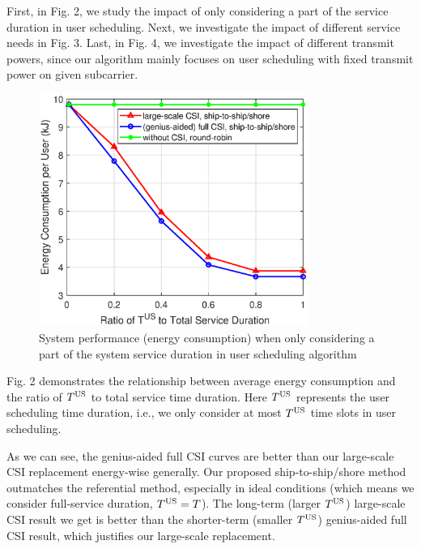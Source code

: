 \documentclass[journal]{IEEEtran}
\begin{document}
   
   
   First, in Fig. 2, we study the impact of only considering a part of the service duration in user scheduling. 
   Next, we investigate the impact of different service needs in Fig. 3. 
   Last, in Fig. 4, we investigate the impact of different transmit powers, since our algorithm mainly focuses on user scheduling with fixed transmit power on given subcarrier. 
   
   
   \begin{figure} [htb]
   \begin{center}
   \includegraphics*[width=8.8cm]{Tranges.eps}
   \end{center}
   \vspace*{-4mm} 
   \caption{System performance (energy consumption) when only considering a part of the system service duration in user scheduling algorithm} \label{fig:2}
   \vspace*{-2mm} 
   \end{figure}
   
   
   Fig. 2 demonstrates the relationship between average energy consumption and the ratio of ${T^{\rm{US}}}$ to total service time duration. Here ${T^{\rm{US}}}$ represents the user scheduling time duration, i.e., we only consider at most $T^{\rm{US}}$ time slots in user scheduling. 
   
   As we can see, the genius-aided full CSI curves are better than our large-scale CSI replacement energy-wise generally. Our proposed ship-to-ship/shore method outmatches the referential method, especially in ideal conditions (which means we consider full-service duration, ${T^{\rm{US}}}=T$). 
   The long-term (larger $T^{\rm{US}}$) large-scale CSI result we get is better than the shorter-term (smaller $T^{\rm{US}}$) genius-aided full CSI result, which justifies our large-scale replacement. 
   
\end{document}
